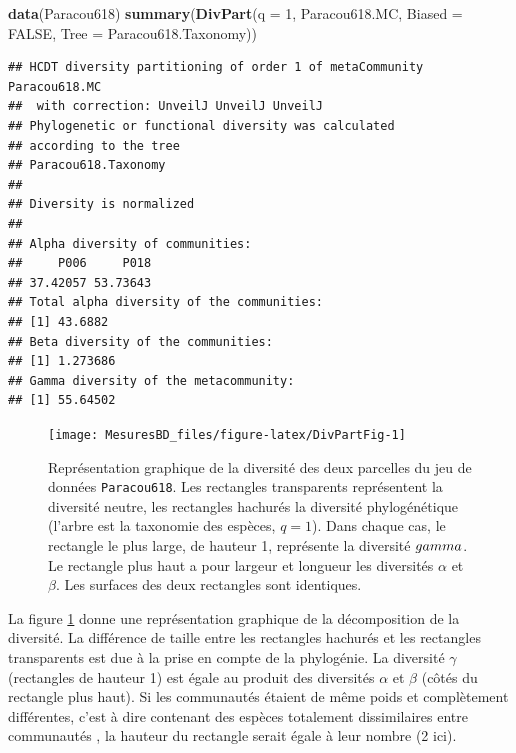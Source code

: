 \documentclass[
  11pt,
  french,
  a4paper,
  extrafontsizes,onecolumn,openright
  ]{memoir}
\newenvironment{Shaded}{\begin{snugshade}}{\end{snugshade}}
\newcommand{\DataTypeTok}[1]{\textcolor[rgb]{0.13,0.29,0.53}{#1}}
\newcommand{\DecValTok}[1]{\textcolor[rgb]{0.00,0.00,0.81}{#1}}
\newcommand{\KeywordTok}[1]{\textcolor[rgb]{0.13,0.29,0.53}{\textbf{#1}}}
\newcommand{\NormalTok}[1]{#1}
\newcommand{\OtherTok}[1]{\textcolor[rgb]{0.56,0.35,0.01}{#1}}
\begin{document}
\scriptsize

\begin{Shaded}
\begin{Highlighting}[]
\KeywordTok{data}\NormalTok{(Paracou618)}
\KeywordTok{summary}\NormalTok{(}\KeywordTok{DivPart}\NormalTok{(}\DataTypeTok{q =} \DecValTok{1}\NormalTok{, Paracou618.MC, }\DataTypeTok{Biased =} \OtherTok{FALSE}\NormalTok{,}
                \DataTypeTok{Tree =}\NormalTok{ Paracou618.Taxonomy))}
\end{Highlighting}
\end{Shaded}

\begin{verbatim}
## HCDT diversity partitioning of order 1 of metaCommunity Paracou618.MC
##  with correction: UnveilJ UnveilJ UnveilJ
## Phylogenetic or functional diversity was calculated
## according to the tree 
## Paracou618.Taxonomy 
## 
## Diversity is normalized 
## 
## Alpha diversity of communities: 
##     P006     P018 
## 37.42057 53.73643 
## Total alpha diversity of the communities: 
## [1] 43.6882
## Beta diversity of the communities: 
## [1] 1.273686
## Gamma diversity of the metacommunity: 
## [1] 55.64502
\end{verbatim}

\normalsize



\scriptsize

\begin{figure}

{\centering \texttt{[image: MesuresBD\_files/figure-latex/DivPartFig-1]} 

}

\caption{Représentation graphique de la diversité des deux parcelles du jeu de données \texttt{Paracou618}. Les rectangles transparents représentent la diversité neutre, les rectangles hachurés la diversité phylogénétique (l'arbre est la taxonomie des espèces, \(q=1\)). Dans chaque cas, le rectangle le plus large, de hauteur 1, représente la diversité \(\\gamma\). Le rectangle plus haut a pour largeur et longueur les diversités \(\alpha\) et \(\beta\). Les surfaces des deux rectangles sont identiques.}\label{fig:DivPartFig}
\end{figure}

\normalsize

La figure \ref{fig:DivPartFig} donne une représentation graphique de la décomposition de la diversité.
La différence de taille entre les rectangles hachurés et les rectangles transparents est due à la prise en compte de la phylogénie.
La diversité \(\gamma\) (rectangles de hauteur 1) est égale au produit des diversités \(\alpha\) et \(\beta\) (côtés du rectangle plus haut).
Si les communautés étaient de même poids et complètement différentes, c'est à dire contenant des espèces totalement dissimilaires entre communautés \autocite{Pavoine2015a}, la hauteur du rectangle serait égale à leur nombre (2 ici).
\end{document}
